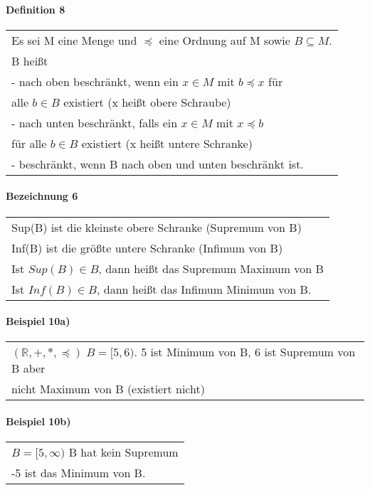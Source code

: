 \documentclass[a4paper]{scrartcl}
\begin{document}
\paragraph{Definition 8}
\begin{tabbing}
\begin{tabular}{l}
Es sei M eine Menge und $\preceq$ eine Ordnung auf M sowie $B\subseteq M$.\\
B heißt \\
- nach oben beschränkt, wenn ein $x\in M$ mit $b\preceq x$ für\\
alle $b\in B$ existiert (x heißt obere Schraube)\\
- nach unten beschränkt, falls ein $x\in M$ mit $x\preceq b$\\
für alle $b\in B$ existiert (x heißt untere Schranke)\\
- beschränkt, wenn B nach oben und unten beschränkt ist.
\end{tabular}
\end{tabbing}

\paragraph{Bezeichnung 6}
\begin{tabbing}
\begin{tabular}{l}
Sup(B) ist die kleinste obere Schranke (Supremum von B)\\
Inf(B) ist die größte untere Schranke (Infimum von B)\\
Ist $Sup(B)\in B$, dann heißt das Supremum Maximum von B\\
Ist $Inf(B)\in B$, dann heißt das Infimum Minimum von B.
\end{tabular}
\end{tabbing}

\paragraph{Beispiel 10a)}
\begin{tabbing}
\begin{tabular}{l}
$(\mathbb{R},+,*,\preceq)\;B=[5,6)$. 5 ist Minimum von B, 6 ist Supremum von B aber\\
nicht Maximum von B (existiert nicht)
\end{tabular}
\end{tabbing}

\paragraph{Beispiel 10b)}
\begin{tabbing}
\begin{tabular}{l}
$B = [5,\infty)$ B hat kein Supremum\\
-5 ist das Minimum von B.
\end{tabular}
\end{tabbing}
\end{document}
